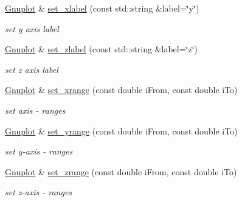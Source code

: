 \begin{DoxyCompactItemize}
\mbox{\hyperlink{class_gnuplot}{Gnuplot}} \& \mbox{\hyperlink{class_gnuplot_aa93589a95aeab869ba731e2583843ae4}{set\+\_\+xlabel}} (const std\+::string \&label=\char`\"{}y\char`\"{})
\begin{DoxyCompactList}\small\item\em set y axis label \end{DoxyCompactList}\item 
\mbox{\label{class_gnuplot_ab3206e715d20f05cc0dd1eec89ce8b07}} 
\mbox{\hyperlink{class_gnuplot}{Gnuplot}} \& \mbox{\hyperlink{class_gnuplot_ab3206e715d20f05cc0dd1eec89ce8b07}{set\+\_\+zlabel}} (const std\+::string \&label=\char`\"{}z\char`\"{})
\begin{DoxyCompactList}\small\item\em set z axis label \end{DoxyCompactList}\item 
\mbox{\label{class_gnuplot_a4b8d96018f2d2d4e2922d4df153d6a84}} 
\mbox{\hyperlink{class_gnuplot}{Gnuplot}} \& \mbox{\hyperlink{class_gnuplot_a4b8d96018f2d2d4e2922d4df153d6a84}{set\+\_\+xrange}} (const double i\+From, const double i\+To)
\begin{DoxyCompactList}\small\item\em set axis -\/ ranges \end{DoxyCompactList}\item 
\mbox{\label{class_gnuplot_a461271b7bfd4f84bdfc0055457226f28}} 
\mbox{\hyperlink{class_gnuplot}{Gnuplot}} \& \mbox{\hyperlink{class_gnuplot_a461271b7bfd4f84bdfc0055457226f28}{set\+\_\+yrange}} (const double i\+From, const double i\+To)
\begin{DoxyCompactList}\small\item\em set y-\/axis -\/ ranges \end{DoxyCompactList}\item 
\mbox{\label{class_gnuplot_a7273f6a48024117b4d234d0251106e78}} 
\mbox{\hyperlink{class_gnuplot}{Gnuplot}} \& \mbox{\hyperlink{class_gnuplot_a7273f6a48024117b4d234d0251106e78}{set\+\_\+zrange}} (const double i\+From, const double i\+To)
\begin{DoxyCompactList}\small\item\em set z-\/axis -\/ ranges \end{DoxyCompactList}\item 

\end{DoxyCompactItemize}
